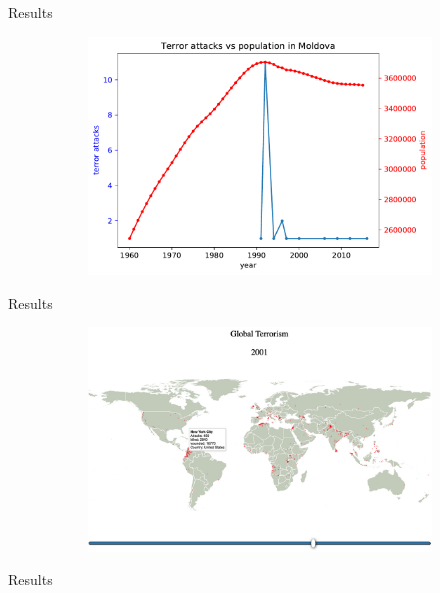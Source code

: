 \documentclass{beamer}
\begin{document}
\begin{frame}{Results}
\begin{figure}
\begin{subfigure}[b]{0.3\textwidth}
			\includegraphics[width=\textwidth]{Population-Terror/attackVsPopulationMoldova}
		\end{subfigure}
	\end{figure}
\end{frame}


\begin{frame}{Results}
	\begin{figure}
		\begin{subfigure}[b]{\textwidth}
			\includegraphics[width=\textwidth]{911.png}
		\end{subfigure}
	\end{figure}
\end{frame}


\begin{frame}{Results}
\centering
\end{frame}



\end{document}
